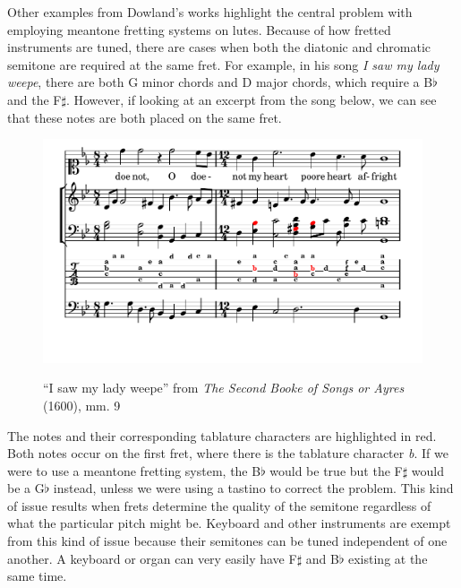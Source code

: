 Other examples from Dowland's works highlight the central problem with employing
meantone fretting systems on lutes.  Because of how fretted instruments are tuned,
there are cases when both the diatonic and chromatic semitone are required at the same
fret. For example, in his song \textit{I saw my lady weepe}, there are both G minor
chords and D major chords, which require a B$\flat$ and the F$\sharp$. However, if
looking at an excerpt from the song below, we can see that these notes are both placed on
the same fret.
\begin{figure}[h]
\centering
\includegraphics{examples/saw.pdf}
\label{dowland-saw}
\caption{``I saw my lady weepe'' from \textit{The Second Booke of Songs or Ayres} (1600), mm. 9}
\end{figure}
The notes and their corresponding tablature characters are highlighted in red.  Both
notes occur on the first fret, where there is the tablature character \textit{b}.  If
we were to use a meantone fretting system, the B$\flat$ would be true but the F$\sharp$
would be a G$\flat$ instead, unless we were using a tastino to correct the problem.
This kind of issue results when frets determine the quality of the semitone regardless
of what the particular pitch might be.  Keyboard and other instruments are exempt from
this kind of issue because their semitones can be tuned independent of one another.  A
keyboard or organ can very easily have F$\sharp$ and B$\flat$ existing at the same time.


